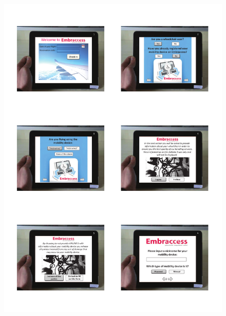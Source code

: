 \begin{figure}[h]
  \centering
     \includegraphics[scale=0.75]{images/App_UI_1.pdf}
  \label{fig:App_UI_1}
\end{figure}

